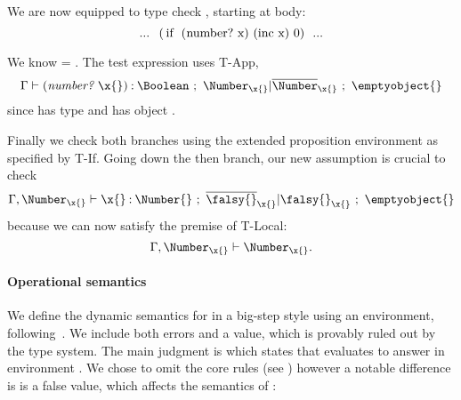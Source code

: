{We are now equipped to type check
, starting at body:
$$
\clj{... (if (number? x) (inc x) 0) ...}
$$

We know {\propenv{}} = {\isprop{\UnionNilNum{}}{\x{}}}.
The test expression uses T-App, 
$$
\judgement{\propenv{}}{\appexp{\numberhuh{}}{\x{}}}{\Boolean}{\filterset{\isprop{\Number}{\x{}}}{\notprop{\Number}{\x{}}}}{\emptyobject{}}
$$
since \numberhuh{} has type
{\ArrowOne{\x{}}{\Top}{\Boolean}
        {\filterset{\isprop{\Number}{\x{}}}{\notprop{\Number}{\x{}}}}{\emptyobject{}}}
      and \x{} has object \x{}.

Finally we check both branches using the extended proposition environment as specified by T-If.
Going down the then branch, our new assumption {\isprop{\Number}{\x{}}} is crucial to check
$$
\judgement{{\propenv{}},{\isprop{\Number}{\x{}}}}{\x{}}{\Number{}}{\filterset{\notprop{\falsy{}}{\x{}}}{\isprop{\falsy{}}{\x{}}}}{\emptyobject{}}
$$
because we can now satisfy the premise of T-Local:
$$
\inpropenv{{\propenv{}},\isprop{\Number}{\x{}}}{\isprop{\Number}{\x{}}}.
$$


\paragraph{Operational semantics} We define the dynamic semantics for \lambdatc{}
in a big-step style using an environment, following~\citet{TF10}.
We include both errors and a \wrong{} value, which is provably ruled out by the
type system.
The main judgment is 
which states that \e{} evaluates to answer  in environment
\openv{}. We chose to omit the core rules (see )
however a notable difference is \nil{} is a false value, which affects the
semantics of \ifliteral{}:

}
